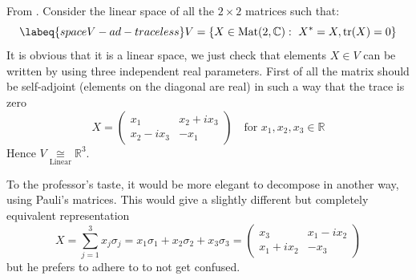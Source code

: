 \documentclass[../main.tex]{subfiles}
\begin{document}
From . Consider the linear space of all the $2\times 2$ matrices such that:
\begin{equation}\labeq{spaceV-ad-traceless}
V=\Bqty{X\in\textrm{Mat}(2,\mathbb{C}): \ X^\ast=X, \tr(X)=0}
\end{equation}
It is obvious that it is a linear space, we just check that elements $X\in V$ can be written by using three independent real parameters. First of all the matrix should be self-adjoint (elements on the diagonal are real) in such a way that the trace is zero
\[
X=
\begin{pmatrix}
x_1 & x_2+ix_3\\
x_2-ix_3 & -x_1
\end{pmatrix} \quad \textrm{for } x_1,x_2,x_3\in \mathbb{R}
\]
Hence $V\underset{\textrm{Linear}}{\cong} \mathbb{R}^3$. 
\begin{kaobox}
To the professor's taste, it would be more elegant to decompose in another way, using Pauli's matrices. This would give a slightly different but completely equivalent representation
\[
X=\sum_{j=1}^3x_j\sigma_j=x_1\sigma_1+x_2\sigma_2+x_3\sigma_3=
\begin{pmatrix}
x_3 & x_1-ix_2\\
x_1+ix_2 & -x_3
\end{pmatrix}
\]
but he prefers to adhere to \cite{Hall2015} to not get confused.
\end{kaobox}
\end{document}
